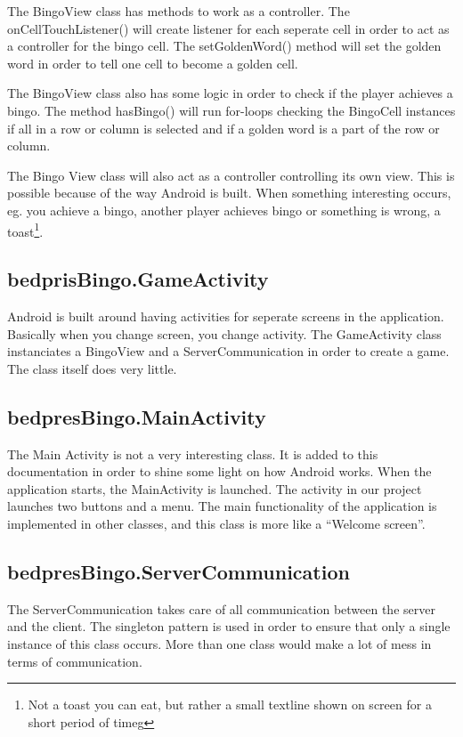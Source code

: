 The BingoView class has methods to work as a controller. The onCellTouchListener() will create listener for each seperate cell in order to act as a controller for the bingo cell. The setGoldenWord() method will set the golden word in order to tell one cell to become a golden cell. 

The BingoView class also has some logic in order to check if the player achieves a bingo. The method hasBingo() will run for-loops checking the BingoCell instances if all in a row or column is selected and if a golden word is a part of the row or column.

The Bingo View class will also act as a controller controlling its own view. This is possible because of the way Android is built. When something interesting occurs, eg. you achieve a bingo, another player achieves bingo or something is wrong, a toast\footnote[1]{Not a toast you can eat, but rather a small textline shown on screen for a short period of timeg}. 


\subsection{bedprisBingo.GameActivity}
Android is built around having activities for seperate screens in the application. Basically when you change screen, you change activity. The GameActivity class instanciates a BingoView and a ServerCommunication in order to create a game. The class itself does very little.


\subsection{bedpresBingo.MainActivity}
The Main Activity is not a very interesting class. It is added to this documentation in order to shine some light on how Android works. When the application starts, the MainActivity is launched. The activity in our project launches two buttons and a menu. The main functionality of the application is implemented in other classes, and this class is more like a ``Welcome screen''. 


\subsection{bedpresBingo.ServerCommunication}
The ServerCommunication takes care of all communication between the server and the client. The singleton pattern is used in order to ensure that only a single instance of this class occurs. More than one class would make a lot of mess in terms of communication. 


